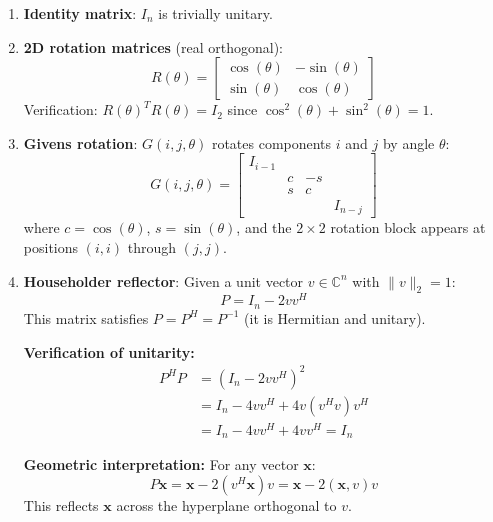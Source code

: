 \documentclass[../../main.tex]{subfiles}
\begin{document}
\begin{enumerate}
    \item \textbf{Identity matrix}: $I_n$ is trivially unitary.

    \item \textbf{2D rotation matrices} (real orthogonal):
          \begin{equation}
              R(\theta) = \begin{bmatrix}
                  \cos(\theta) & -\sin(\theta) \\
                  \sin(\theta) & \cos(\theta)
              \end{bmatrix}
          \end{equation}
          Verification: $R(\theta)^T R(\theta) = I_2$ since $\cos^2(\theta) + \sin^2(\theta) = 1$.

    \item \textbf{Givens rotation}: $G(i,j,\theta)$ rotates components $i$ and $j$ by angle $\theta$:
          \begin{equation}
              G(i,j,\theta) = \begin{bmatrix}
                  I_{i-1} &   &    &         \\
                          & c & -s &         \\
                          & s & c  &         \\
                          &   &    & I_{n-j}
              \end{bmatrix}
          \end{equation}
          where $c = \cos(\theta)$, $s = \sin(\theta)$, and the $2 \times 2$ rotation block appears at positions $(i,i)$ through $(j,j)$.

    \item \textbf{Householder reflector}: Given a unit vector $v \in \mathbb{C}^n$ with $\|v\|_2 = 1$:
          \begin{equation}
              P = I_n - 2 v v^H
          \end{equation}
          This matrix satisfies $P = P^H = P^{-1}$ (it is Hermitian and unitary).

          \textbf{Verification of unitarity:}
          \begin{align}
              P^H P & = (I_n - 2 v v^H)^2               \\
                    & = I_n - 4 v v^H + 4 v (v^H v) v^H \\
                    & = I_n - 4 v v^H + 4 v v^H = I_n
          \end{align}

          \textbf{Geometric interpretation:} For any vector $\mathbf{x}$:
          \begin{equation}
              P \mathbf{x} = \mathbf{x} - 2 (v^H \mathbf{x}) v = \mathbf{x} - 2 (\mathbf{x}, v) v
          \end{equation}
          This reflects $\mathbf{x}$ across the hyperplane orthogonal to $v$.
\end{enumerate}
\end{document}
